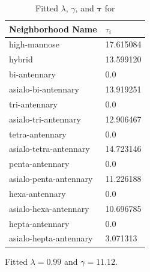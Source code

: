     \begin{table}[h]
        \begin{threeparttable}
            \caption{Fitted $\lambda$, $\gamma$, and $\mathbf{\tau}$ for
                     \philbs \label{tab:philbs_parameters}}
            \begin{tabular}{l l}
                \toprule    
                Neighborhood Name & $\tau_i$ \\
                \midrule
                high-mannose & 17.615084 \\
                hybrid & 13.599120 \\
                bi-antennary & 0.0 \\
                asialo-bi-antennary & 13.919251 \\
                tri-antennary & 0.0 \\
                asialo-tri-antennary & 12.906467 \\
                tetra-antennary & 0.0 \\
                asialo-tetra-antennary & 14.723146 \\
                penta-antennary & 0.0 \\
                asialo-penta-antennary & 11.226188 \\
                hexa-antennary & 0.0 \\
                asialo-hexa-antennary & 10.696785 \\
                hepta-antennary & 0.0 \\
                asialo-hepta-antennary & 3.071313 \\
                \bottomrule
            \end{tabular}
            \begin{tablenotes}[normal]
                \item Fitted $\lambda = 0.99$ and $\gamma = 11.12$.
            \end{tablenotes}
        \end{threeparttable}
    \end{table}

